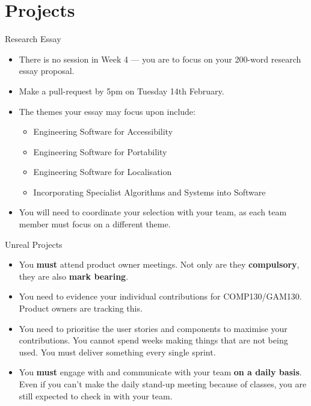 \part{Projects}
\frame{\partpage}

\begin{frame}{Research Essay}

	\begin{itemize}
		\item  There is no session in Week 4 --- you are to focus on your 200-word research essay proposal.
		\item  Make a pull-request by 5pm on Tuesday 14th February.
		\item  The themes your essay may focus upon include:
		\begin{itemize}
			\item  Engineering Software for Accessibility
			\item  Engineering Software for Portability
			\item  Engineering Software for Localisation
			\item  Incorporating Specialist Algorithms and Systems into Software
		\end{itemize}
		\item  You will need to coordinate your selection with your team, as each team member must focus on a different theme.
	\end{itemize}

\end{frame}

\begin{frame}{Unreal Projects}

	\begin{itemize}
		\item  You \textbf{must} attend product owner meetings. Not only are they \textbf{compulsory}, they are also \textbf{mark bearing}.
		\item  You need to evidence your individual contributions for COMP130/GAM130. Product owners are tracking this.
		\item  You need to prioritise the user stories and components to maximise your contributions. You cannot spend weeks making things that are not being used. You must deliver something every single sprint.
		\item  You \textbf{must} engage with and communicate with your team \textbf{on a daily basis}. Even if you can't make the daily stand-up meeting because of classes, you are still expected to check in with your team.
	\end{itemize}

\end{frame}


